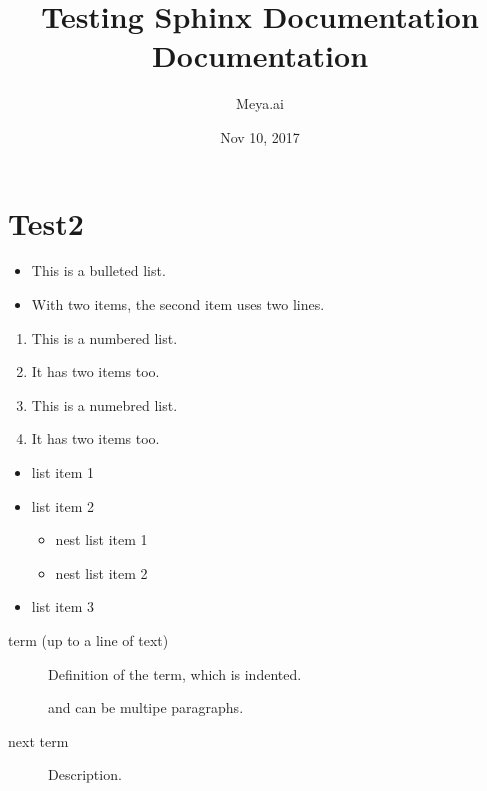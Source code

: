 \documentclass[letterpaper,10pt,english]{sphinxmanual}
\title{Testing Sphinx Documentation Documentation}
\date{Nov 10, 2017}
\author{Meya.ai}
\begin{document}
\maketitle
\sphinxtableofcontents
{}\label{\detokenize{index::doc}}



\chapter{Test2}
\label{\detokenize{page2:test2}}\label{\detokenize{page2::doc}}\label{\detokenize{page2:welcome-to-testing-sphinx-documentation-s-documentation}}


\begin{itemize}
\item {} 
This is a bulleted list.

\item {} 
With two items, the second
item uses two lines.

\end{itemize}
\begin{enumerate}
\item {} 
This is a numbered list.

\item {} 
It has two items too.

\item {} 
This is a numebred list.

\item {} 
It has two items too.

\end{enumerate}
\begin{itemize}
\item {} 
list item 1

\item {} 
list item 2
\begin{itemize}
\item {} 
nest list item 1

\item {} 
nest list item 2

\end{itemize}

\item {} 
list item 3

\end{itemize}
\begin{description}
\item[{term (up to a line of text)}] \leavevmode
Definition of the term, which is indented.

and can be multipe paragraphs.

\item[{next term}] \leavevmode
Description.

\end{description}
\end{document}
